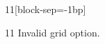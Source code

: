 \documentclass[paper=A4]{ropas-poster}
\begin{document}
\begin{postergrid}{1}{1}[block-sep=-1bp]
\begin{posterblock}{1}{1}
Invalid grid option.
\end{posterblock}
\end{postergrid}
\end{document}
